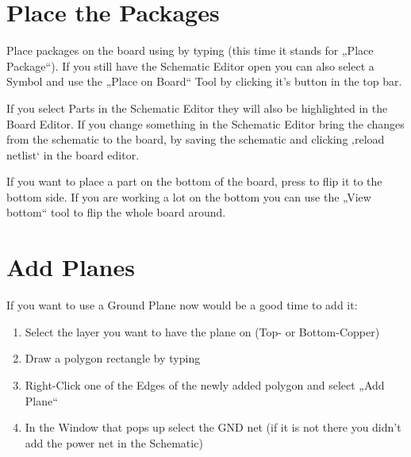 \documentclass[letterpaper,10pt,czech]{sphinxmanual}
\begin{document}
\noindent{}


\section{Place the Packages}
\label{\detokenize{create-board:place-the-packages}}
Place packages on the board using by typing  (this time it stands for „Place Package“). If you still have the Schematic Editor open you can also select a Symbol and use the „Place on Board“ Tool by clicking it’s button in the top bar.

If you select Parts in the Schematic Editor they will also be highlighted in the Board Editor. If you change something in the Schematic Editor bring the changes from the schematic to the board, by saving the schematic and clicking ‚reload netlist‘ in the board editor.

\noindent{}

If you want to place a part on the bottom of the board, press  to flip it to the bottom side. If you are working a lot on the bottom you can use the „View bottom“ tool to flip the whole board around.


\section{Add Planes}
\label{\detokenize{create-board:add-planes}}
If you want to use a Ground Plane now would be a good time to add it:
\begin{enumerate}
\def\theenumi{\arabic{enumi}}
\def\labelenumi{\theenumi .}
\makeatletter\def\p@enumii{\p@enumi \theenumi .}\makeatother
\item {} 
Select the layer you want to have the plane on (Top- or Bottom-Copper)

\item {} 
Draw a polygon rectangle by typing 

\item {} 
Right-Click one of the Edges of the newly added polygon and select „Add Plane“

\item {} 
In the Window that pops up select the GND net (if it is not there you didn’t add the power net in the Schematic)

\end{enumerate}

\noindent{}
\end{document}

